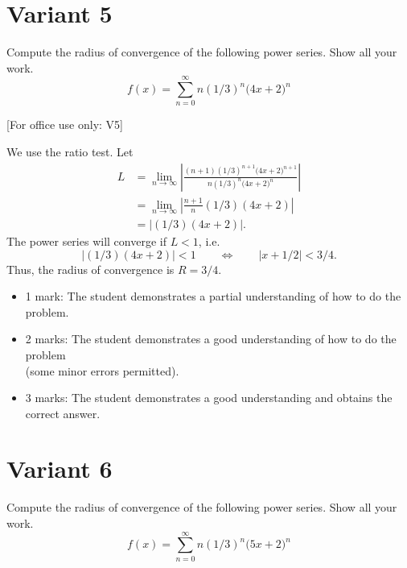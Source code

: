 \documentclass{article}
\begin{document}
        \newpage
        \section{Variant 5}
        \label{v5}


Compute the radius of convergence of the following power series. Show all your work.
    \[
    f(x) = \sum_{n=0}^\infty n\left(1/3\right)^n \big(4x + 2\big)^n
    \]


[For office use only: V5]
        \medskip



    We use the ratio test. Let
      \begin{align*}
        L &= \lim_{n\to\infty} \left| 
        \frac{(n+1)\left(1/3\right)^{n+1}\big(4x + 2\big)^{n+1}}
        {n\left(1/3\right)^n \big(4x + 2\big)^n}
        \right|\\
        &= \lim_{n\to\infty} \left| \frac{n+1}{n}(1/3)(4x+2)\right| \\
        &= \left| (1/3)(4x+2)\right|.
       \end{align*}
       The power series will converge if $L < 1$, i.e.
       \[
        \left| (1/3)(4x+2)\right| < 1 \qquad\Longleftrightarrow \qquad
        \left|x + 1/2\right| < 3/4.
       \]
       Thus, the radius of convergence is $R = 3/4$.
        \medskip

            \begin{small}
            \begin{itemize}
            \item 1 mark: The student demonstrates a partial understanding of how to do the problem.
            \item 2 marks: The student demonstrates a good understanding of how to do the problem \\ (some minor errors permitted).
            \item 3 marks: The student demonstrates a good understanding and obtains the correct answer.
            \end{itemize}
            \end{small}


        \newpage
        \section{Variant 6}
        \label{v6}


Compute the radius of convergence of the following power series. Show all your work.
    \[
    f(x) = \sum_{n=0}^\infty n\left(1/3\right)^n \big(5x + 2\big)^n
    \]
\end{document}
